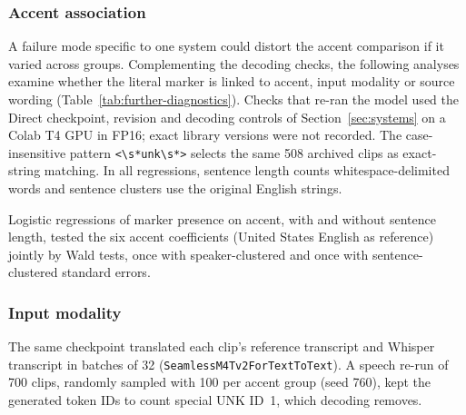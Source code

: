 \subsubsection{Accent association}
\label{sec:further-diagnostic-method}

A failure mode specific to one system could distort the accent comparison if
it varied across groups. Complementing the decoding checks, the following
analyses examine whether the literal \unk{} marker is linked to accent,
input modality or source wording (Table~\ref{tab:further-diagnostics}).
Checks that re-ran the model used the
Direct checkpoint, revision and decoding controls of Section~\ref{sec:systems}
on a Colab T4 GPU in FP16; exact library versions were not recorded. The
case-insensitive pattern \verb|<\s*unk\s*>| selects the same 508 archived
clips as exact-string matching. In all regressions, sentence length counts
whitespace-delimited words and sentence clusters use the original English
strings.

Logistic regressions of marker presence on accent, with and
without sentence length, tested the six accent coefficients (United States
English as reference) jointly by Wald tests, once with speaker-clustered and
once with sentence-clustered standard errors.

\subsubsection{Input modality}
The same checkpoint translated each clip's reference transcript
and Whisper transcript in batches of 32
(\texttt{SeamlessM4Tv2ForTextToText}). A speech re-run of 700
clips, randomly sampled with 100 per accent group (seed 760), kept the
generated token IDs to count special UNK ID~1, which decoding removes.

